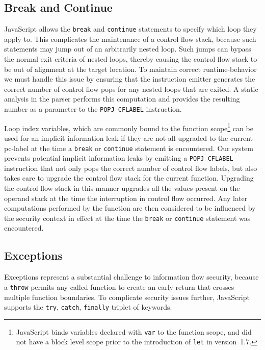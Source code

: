 \subsection{Break and Continue}
\label{sec:break-and-continue}
JavaScript allows the \texttt{break} and \texttt{continue} statements to specify which loop they apply to.
This complicates the maintenance of a control flow stack, because such statements may jump out of an arbitrarily nested loop.
Such jumps can bypass the normal exit criteria of nested loops, thereby causing the control flow stack to be out of alignment at the target location.
To maintain correct runtime-behavior we must handle this issue by ensuring that the instruction emitter generates the correct number of control flow pops for any nested loops that are exited.
A static analysis in the parser performs this computation and provides the resulting number as a parameter to the \texttt{POPJ\_CFLABEL} instruction.

Loop index variables, which are commonly bound to the function scope\footnote{JavaScript binds variables declared with \texttt{var} to the function scope, and did not have a block level scope prior to the introduction of \texttt{let} in version~1.7.} can be used for an implicit information leak if they are not all upgraded to the current pc-label at the time a \texttt{break} or \texttt{continue} statement is encountered.
Our system prevents potential implicit information leaks by emitting a \texttt{POPJ\_CFLABEL} instruction that not only pops the correct number of control flow labels, but also takes care to upgrade the control flow stack for the current function.
Upgrading the control flow stack in this manner upgrades all the values present on the operand stack at the time the interruption in control flow occurred.
Any later computations performed by the function are then considered to be influenced by the security context in effect at the time the \texttt{break} or \texttt{continue} statement was encountered.

\subsection{Exceptions}
\label{sec:exceptions}
Exceptions represent a substantial challenge to information flow security, because a \texttt{throw} permits any called function to create an early return that crosses multiple function boundaries.
To complicate security issues further, JavaScript supports the \texttt{try}, \texttt{catch}, \texttt{finally} triplet of keywords.

